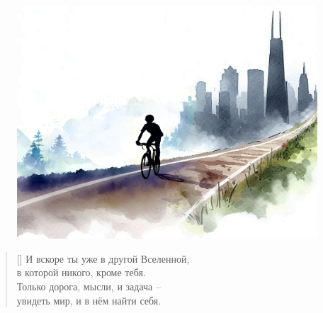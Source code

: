 \documentclass[a5paper,11pt]{memoir}
\begin{document}
\begin{figure}
	\hspace{-32pt}
	\includegraphics[width=\paperwidth]{images/city-gloom.png}
  \end{figure}

\clearpage

\begin{verse}[\versewidth]
И вскоре ты уже в другой Вселенной,\\
в которой никого, кроме тебя.\\
Только дорога, мысли, и задача -- \\
увидеть мир, и в нём найти себя.
\end{verse}

\end{document}

